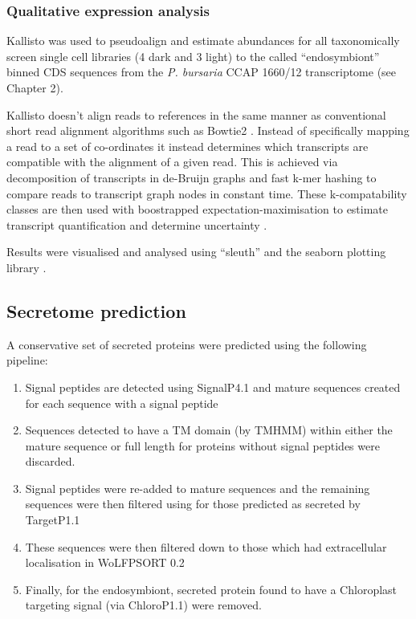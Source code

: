 \subsubsection{Qualitative expression analysis}

Kallisto \citep{Bray2015} was used to pseudoalign and estimate abundances for 
all taxonomically screen single cell 
libraries (4 dark and 3 light) to the called ``endosymbiont''
binned CDS sequences from the \textit{P. bursaria} CCAP 1660/12
transcriptome (see Chapter 2).

Kallisto doesn't align reads to references in the same
manner as conventional short read alignment algorithms
such as Bowtie2 \citep{Langmead2012}.  Instead of specifically 
mapping a read to a set of co-ordinates it instead
determines which transcripts are compatible with the alignment 
of a given read.  This is achieved via decomposition of transcripts
in de-Bruijn graphs and fast k-mer hashing to compare reads to transcript
graph nodes in constant time.  These k-compatability classes are then used with
boostrapped expectation-maximisation to estimate transcript quantification and
determine uncertainty \citep{Bray2015}. 

Results were visualised and analysed using ``sleuth'' and the
seaborn plotting library \citep{michael_waskom_2015_19108}.

\subsection{Secretome prediction}

A conservative set of secreted proteins were predicted 
using the following pipeline:
\begin{enumerate}
    \item Signal peptides are detected using SignalP4.1 and mature sequences
        created for each sequence with a signal peptide
    \item Sequences detected to have a TM domain (by TMHMM) within either the mature sequence or 
        full length for proteins without signal peptides were discarded.
    \item Signal peptides were re-added to mature sequences and the 
        remaining sequences were then filtered using for those predicted as secreted by TargetP1.1 
    \item These sequences were then filtered down to those which had extracellular
        localisation in WoLFPSORT 0.2 
    \item Finally, for the endosymbiont, secreted protein found to have a Chloroplast
        targeting signal (via ChloroP1.1) were removed.
\end{enumerate}

